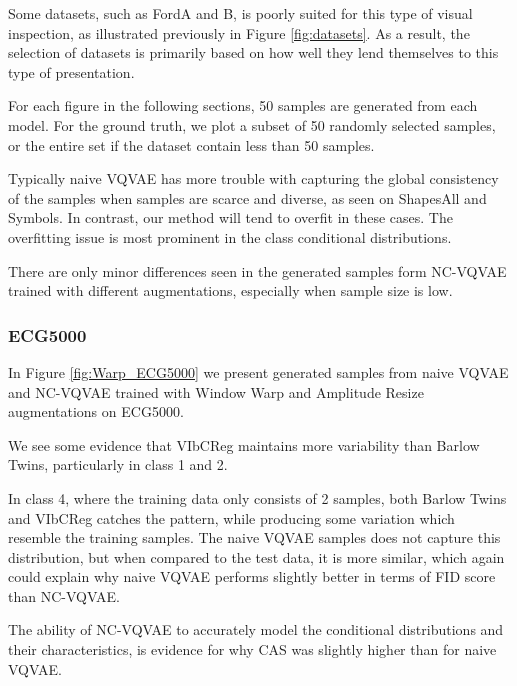 \documentclass[../../thesis.tex]{subfiles}
\begin{document}
Some datasets, such as FordA and B, is poorly suited for this type of visual inspection, as illustrated previously in Figure \ref{fig:datasets}. As a result, the selection of datasets is primarily based on how well they lend themselves to this type of presentation.\newline

For each figure in the following sections, 50 samples are generated from each model. For the ground truth, we plot a subset of 50 randomly selected samples, or the entire set if the dataset contain less than 50 samples.\newline

Typically naive VQVAE has more trouble with capturing the global consistency of the samples when samples are scarce and diverse, as seen on ShapesAll and Symbols. In contrast, our method will tend to overfit in these cases. The overfitting issue is most prominent in the class conditional distributions. \newline

There are only minor differences seen in the generated samples form NC-VQVAE trained with different augmentations, especially when sample size is low.\newline

\subsubsection{ECG5000}

In Figure \ref{fig:Warp_ECG5000} we present generated samples from naive VQVAE and NC-VQVAE trained with Window Warp and Amplitude Resize augmentations on ECG5000.\newline

We see some evidence that VIbCReg maintains more variability than Barlow Twins, particularly in class 1 and 2. \newline

In class 4, where the training data only consists of 2 samples, both Barlow Twins and VIbCReg catches the pattern, while producing some variation which resemble the training samples. The naive VQVAE samples does not capture this distribution, but when compared to the test data, it is more similar, which again could explain why naive VQVAE performs slightly better in terms of FID score than NC-VQVAE. \newline

The ability of NC-VQVAE to accurately model the conditional distributions and their characteristics, is evidence for why CAS was slightly higher than for naive VQVAE.
\end{document}
